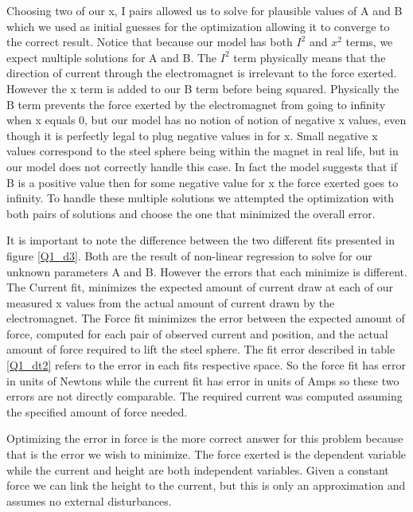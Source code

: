 \documentclass{article}
\theoremstyle{plain}
\theoremstyle{definition}
\theoremstyle{remark}
\begin{document}
Choosing two of our x, I pairs allowed us to solve for plausible values of A and B which we used as initial guesses for the optimization allowing it to converge to the correct result.  Notice that because our model has both $I^2$ and $x^2$ terms, we expect multiple solutions for A and B.  The $I^2$ term physically means that the direction of current through the electromagnet is irrelevant to the force exerted.  However the x term is added to our B term before being squared.  Physically the B term prevents the force exerted by the electromagnet from going to infinity when x equals 0, but our model has no notion of notion of negative x values, even though it is perfectly legal to plug negative values in for x.  Small negative x values correspond to the steel sphere being within the magnet in real life, but in our model does not correctly handle this case.  In fact the model suggests that if B is a positive value then for some negative value for x the force exerted goes to infinity.  To handle these multiple solutions we attempted the optimization with both pairs of solutions and choose the one that minimized the overall error.  

 It is important to note the difference between the two different fits presented in figure \ref{Q1_d3}.  Both are the result of non-linear regression to solve for our unknown parameters A and B.  However the errors that each minimize is different.  The Current fit, minimizes the expected amount of current draw at each of our measured x values from the actual amount of current drawn by the electromagnet.  The Force fit minimizes the error between the expected amount of force, computed for each pair of observed current and position, and the actual amount of force required to lift the steel sphere.  The fit error described in table \ref{Q1_dt2} refers to the error in each fits respective space.  So the force fit has error in units of Newtons while the current fit has error in units of Amps so these two errors are not directly comparable.  The required current was computed assuming the specified amount of force needed.

Optimizing the error in force is the more correct answer for this problem because that is the error we wish to minimize. The force exerted is the dependent variable while the current and height are both independent variables.  Given a constant force we can link the height to the current, but this is only an approximation and assumes no external disturbances.  
\end{document}
